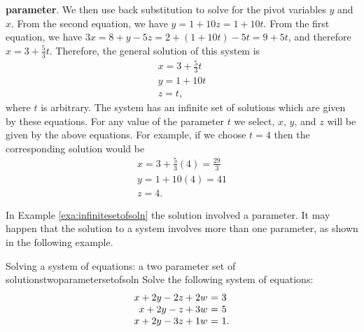 \begin{solution}
  \textbf{parameter}. We then use back substitution
  to solve for the pivot variables $y$ and $x$. From the second
  equation, we have $y = 1+10z = 1+10t$. From the first equation, we
  have $3x = 8+y-5z = 2+(1+10t)-5t = 9+5t$, and therefore
  $x=3+\frac{5}{3}t$. Therefore, the general solution of this system
  is
  \[
    \begin{array}{l}
      x=3+\frac{5}{3}t \\
      y=1+10t \\
      z=t,
    \end{array}
  \]
  where $t$ is arbitrary. The system has an infinite set of solutions
  which are given by these equations. For any value of the parameter
  $t$ we select, $x$, $y$, and $z$ will be given by the above
  equations. For example, if we choose $t=4$ then the corresponding
  solution would be
  \[
    \begin{array}{l}
      x = 3 + \frac{5}{3}(4) = \frac{29}{3}\\
      y = 1+10(4) = 41 \\
      z = 4.
    \end{array}
  \]
\end{solution}

In Example \ref{exa:infinitesetofsoln} the solution involved a
parameter. It may happen that the solution to a system involves more
than one parameter, as shown in the following example.

\begin{example}{Solving a system of equations: a two parameter set of solutions}{twoparametersetofsoln}
  Solve the following system of equations:
  \begin{equation*}
    \begin{array}{r@{~}c@{~}l}
      x +2y  -2z  +2w &=& 3 \\
      x +2y  -z   +3w &=& 5 \\
      x +2y  -3z  +1w &=& 1.
    \end{array}
  \end{equation*}
\end{example}

